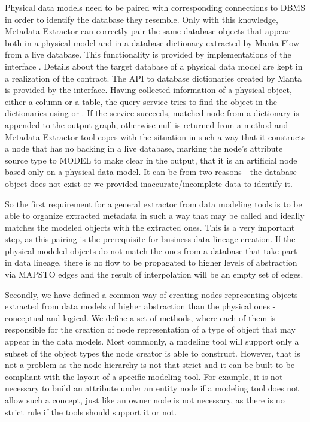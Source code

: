Physical data models need to be paired with corresponding connections to DBMS in order to identify the database they resemble. 
Only with this knowledge, Metadata Extractor can correctly pair the same database objects that appear both in a physical model and in a database dictionary extracted by Manta Flow from a live database. 
This functionality is provided by implementations of the interface . Details about the target database of a physical data model are kept in a realization of the  contract.
The API to database dictionaries created by Manta is provided by the  interface. 
Having collected information of a physical object, either a column or a table, the query service tries to find the object in the dictionaries using  or . 
If the service succeeds, matched node from a dictionary is appended to the output graph, otherwise null is returned from a  method and Metadata Extractor tool copes with the situation in such a way that it constructs a node that has no backing in a live database, marking the node's attribute source type to MODEL to make clear in the output, that it is an artificial node based only on a physical data model. 
It can be from two reasons - the database object does not exist or we provided inaccurate/incomplete data to identify it.

So the first requirement for a general extractor from data modeling tools is to be able to organize extracted metadata in such a way that  may be called and ideally matches the modeled objects with the extracted ones.
This is a very important step, as this pairing is the prerequisite for business data lineage creation. If the physical modeled objects do not match the ones from a database that take part in data lineage, there is no flow to be propagated to higher levels of abstraction via MAPS\textunderscore TO edges and the result of interpolation will be an empty set of edges.

Secondly, we have defined a common way of creating nodes representing objects extracted from data models of higher abstraction than the physical ones - conceptual and logical.
We define a set of methods, where each of them is responsible for the creation of node representation of a type of object that may appear in the data models. Most commonly, a modeling tool will support only a subset of the object types the node creator is able to construct. 
However, that is not a problem as the node hierarchy is not that strict and it can be built to be compliant with the layout of a specific modeling tool. 
For example, it is not necessary to build an attribute under an entity node if a modeling tool does not allow such a concept, just like an owner node is not necessary, as there is no strict rule if the tools should support it or not.

